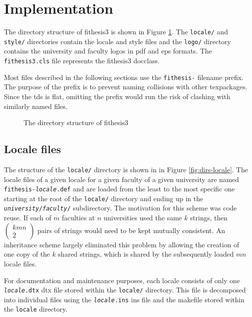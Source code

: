 \documentclass[12pt,twoside,color,table]%
  {fithesis3/fithesis3} %
\begin{document}
  \section{Implementation}
  The directory structure of \textsf{fithesis3} is shown in Figure
  \ref{fig:dirs}. The \texttt{locale/} and \texttt{style/}
  directories contain the locale and style files and the
  \texttt{logo/} directory contains the university
  and faculty logos in \gls{pdf} and \gls{eps} formats. The
  \texttt{fithesis3.cls} file represents the \textsf{fithesis3}
  \gls{docclass}.
  
  Most files described in the following sections use the
  \texttt{fithesis-} filename prefix. The purpose of the prefix is
  to prevent naming collisions with other \glspl{texpackage}. Since
  the \gls{tds} is flat, omitting the prefix would run the risk of
  clashing with similarly named files.

  \begin{figure}
    \centering
    \parbox{0.5\textwidth}{}
    \caption{The directory structure of \textsf{fithesis3}}
    \label{fig:dirs}
  \end{figure}
  
  \subsection{Locale files}
  The structure of the \texttt{locale/} directory is shown in in
  Figure \ref{fig:dirs-locale}. The locale files of a given
  locale for a given faculty of a given university are named
  \texttt{fithesis-\textit{locale}.def} and are
  loaded from the least to the most specific one starting at the
  root of the \texttt{locale/} directory and ending up in the
  \texttt{\textit{university}/\textit{faculty}/}
  subdirectory. The motivation for this
  scheme was code reuse. If each of $m$ faculties at $n$
  universities used the same $k$ strings, then $(\begin{smallmatrix}
  kmn\\2\end{smallmatrix})$ pairs of strings would need to be kept
  mutually consistent. An inheritance scheme largely eliminated
  this problem by allowing the creation of one copy of the $k$
  shared strings, which is shared by the subsequently loaded $mn$
  locale files.

  For documentation and maintenance purposes, each locale consists
  of only one \texttt{\textit{locale}.dtx} \gls{dtx} file stored
  within the \texttt{locale/} directory. This file is decomposed
  into individual files using the \texttt{\textit{locale}.ins}
  \gls{ins} file and the \gls{makefile} stored within the
  \texttt{locale} directory.
\end{document}
